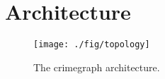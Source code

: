 \section{Architecture}
\label{sec:architecture}

\lipsum[1]

\begin{figure*}
\centering
\texttt{[image: ./fig/topology]}
\caption{The crimegraph architecture.}
\label{fig:architecture}
\end{figure*}

\lipsum[1]

